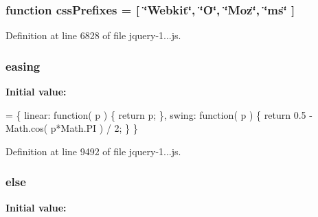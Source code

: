 \subsubsection[{css\+Prefixes}]{\setlength{\rightskip}{0pt plus 5cm}function css\+Prefixes = \mbox{[} \char`\"{}Webkit\char`\"{}, \char`\"{}O\char`\"{}, \char`\"{}Moz\char`\"{}, \char`\"{}ms\char`\"{} \mbox{]}}\label{_scripts_2jquery-1_810_82_8js_a2ed3892172b336458b8074254f4471da}


Definition at line 6828 of file jquery-\/1...\+js.

\hypertarget{_scripts_2jquery-1_810_82_8js_a9758a312629fa6de1744280dd6e6253b}{}
\subsubsection[{easing}]{ easing}\label{_scripts_2jquery-1_810_82_8js_a9758a312629fa6de1744280dd6e6253b}
{\bfseries Initial value\+:}
\begin{DoxyCode}
= \{
    linear: \textcolor{keyword}{function}( p ) \{
        \textcolor{keywordflow}{return} p;
    \},
    swing: \textcolor{keyword}{function}( p ) \{
        \textcolor{keywordflow}{return} 0.5 - Math.cos( p*Math.PI ) / 2;
    \}
\}
\end{DoxyCode}


Definition at line 9492 of file jquery-\/1...\+js.

\hypertarget{_scripts_2jquery-1_810_82_8js_a0544c3fe466e421738dae463968b70ba}{}
\subsubsection[{else}]{\setlength{\rightskip}{0pt plus 5cm}else}\label{_scripts_2jquery-1_810_82_8js_a0544c3fe466e421738dae463968b70ba}
{\bfseries Initial value\+:}


